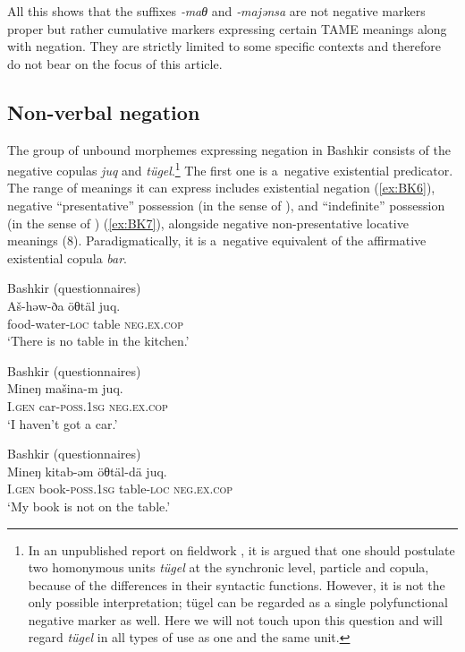 \documentclass[output=paper]{langsci/langscibook}
\begin{document}
All this shows that the suffixes \textit{‑maθ} and \textit{‑majənsa} are not negative markers proper but rather cumulative markers expressing certain TAME meanings along with negation. They are strictly limited to some specific contexts and therefore do not bear on the focus of this article.

\subsection{Non-verbal negation}\label{sec:BK2.2}

The group of unbound morphemes expressing negation in Bashkir consists of the negative copulas \textit{juq} and \textit{tügel}.\footnote{In an unpublished report on fieldwork \citep{mishchenko2011a}, it is argued that one should postulate two homonymous units \textit{tügel} at the synchronic level, particle and copula, because of the differences in their syntactic functions. However, it is not the only possible interpretation; tügel can be regarded as a single polyfunctional negative marker as well. Here we will not touch upon this question and will regard \textit{tügel} in all types of use as one and the same unit.} The first one is a negative existential predicator. The range of meanings it can express includes existential negation (\ref{ex:BK6}), negative “presentative” possession (in the sense of \citealp{hengeveld1992}), and “indefinite” possession (in the sense of \citealp{stassen2009a}) (\ref{ex:BK7}), alongside negative non-presentative locative meanings (8). Paradigmatically, it is a negative equivalent of the affirmative existential copula \textit{bar}.

\ea Bashkir (questionnaires) \label{ex:BK6}\\
	\gll Aš-həw-ða			öθtäl		juq.\\
	food-water-\textsc{loc}	table		\textsc{neg.ex.cop}\\
	\glt `There is no table in the kitchen.'
\z

\ea Bashkir (questionnaires) \label{ex:BK7}\\
	\gll Mineŋ		mašina-m	juq.\\
	I.\textsc{gen}		car-\textsc{poss.1sg}	\textsc{neg.ex.cop}\\
	\glt `I haven’t got a car.'
\z

\ea Bashkir (questionnaires) \label{ex:BK8}\\
	\gll Mineŋ		kitab-əm		öθtäl-dä		juq.\\
	I.\textsc{gen}		book-\textsc{poss.1sg}	table-\textsc{loc}	\textsc{neg.ex.cop}\\
	\glt `My book is not on the table.'
\z
\end{document}
